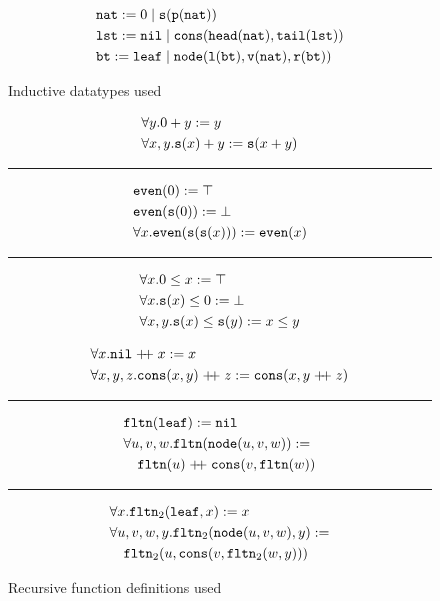 
\begin{figure}
\begin{mdframed}
	$$\begin{aligned}&\mathtt{nat}:=0 \mid \mathtt{s}(\mathtt{p}(\mathtt{nat}))\\
	&\mathtt{lst}:=\mathtt{nil}\mid\mathtt{cons}(\mathtt{head}(\mathtt{nat}),\mathtt{tail}(\mathtt{lst}))\\
	&\mathtt{bt}:=\mathtt{leaf} \mid \mathtt{node}(\mathtt{l}(\mathtt{bt}),\mathtt{v}(\mathtt{nat}),\mathtt{r}(\mathtt{bt}))\end{aligned}$$
\end{mdframed}
\caption{Inductive datatypes used}
\label{fig:datatypes}
\end{figure}
\begin{figure}
\begin{minipage}[t]{0.4\textwidth}
	$$\begin{aligned}&\forall y.0+y:=y\\
	&\forall x,y.\mathtt{s}(x)+y:=\mathtt{s}(x+y)\\
	\end{aligned}$$
	\hrule
	$$\begin{aligned}&\mathtt{even}(0):=\top\\
	&\mathtt{even}(\mathtt{s}(0)):=\bot\\
	&\forall x.\mathtt{even}(\mathtt{s}(\mathtt{s}(x))):=\mathtt{even}(x)\\
	\end{aligned}$$
	\hrule
	$$\begin{aligned}&\forall x.0\leq x:=\top\\
	&\forall x.\mathtt{s}(x)\leq 0:=\bot\\
	&\forall x,y.\mathtt{s}(x)\leq \mathtt{s}(y):=x\leq y\\
	\end{aligned}$$
\end{minipage}
\begin{minipage}[t]{0.5\textwidth}
	$$\begin{aligned}&\forall x.\mathtt{nil}\mathrel{ +\hspace{-1mm}+ } x:=x\\
	&\forall x,y,z.\mathtt{cons}(x,y)\mathrel{ +\hspace{-1mm}+ } z:=\mathtt{cons}(x,y\mathrel{ +\hspace{-1mm}+ } z)\\
	\end{aligned}$$
	\hrule
	$$\begin{aligned}
	&\mathtt{fltn}(\mathtt{leaf}):=\mathtt{nil}\\
	&\forall u,v,w.\mathtt{fltn}(\mathtt{node}(u,v,w)):=\\&\quad\mathtt{fltn}(u)\mathrel{ +\hspace{-1mm}+ }\mathtt{cons}(v,\mathtt{fltn}(w))
	\end{aligned}$$
	\hrule
	$$\begin{aligned}
	&\forall x.\mathtt{fltn}_2(\mathtt{leaf},x):=x\\
	&\forall u,v,w,y.\mathtt{fltn}_2(\mathtt{node}(u,v,w),y):=\\&\quad\mathtt{fltn}_2(u,\mathtt{cons}(v,\mathtt{fltn}_2(w,y)))
	\end{aligned}$$
\end{minipage}
\caption{Recursive function definitions used}
\label{fig:functions}
\end{figure}

